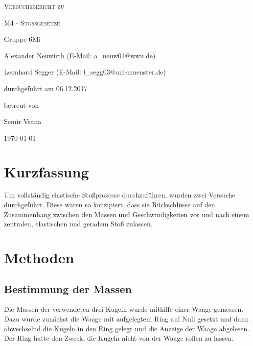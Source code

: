 \documentclass[
	a4paper,
	12pt,
	pagesize,
	ngerman
]{scrartcl}
\begin{document}
	
	\begin{titlepage}
		\centering
		{\scshape\LARGE Versuchsbericht zu \par}
		\vspace{1cm}
		{\scshape\huge M4 - Stoßgesetze\par}
		\vspace{2.5cm}
		{\LARGE Gruppe 6Mi \par}
		\vspace{0.5cm}
		
		{\large Alexander Neuwirth (E-Mail: a\_neuw01@wwu.de) \par}
		{\large Leonhard Segger (E-Mail: l\_segg03@uni-muenster.de) \par}
		\vfill
		
		durchgeführt am 06.12.2017\par
		betreut von\par
		{\large Semir Vrana}
		
		\vfill
		
		{\large \today\par}
	\end{titlepage}
	\tableofcontents
	\newpage
	
	\section{Kurzfassung}
	Um vollständig elastische Stoßprozesse durchzuführen, wurden zwei Versuche durchgeführt.
	Diese waren so konzipiert, dass sie Rückschlüsse auf den Zusammenhang zwischen den Massen und Geschwindigkeiten vor und nach einem zentralen, elastischen und geradem Stoß zulassen.
	
	\section{Methoden}
	\subsection{Bestimmung der Massen}
	Die Massen der verwendeten drei Kugeln wurde mithilfe einer Waage gemessen.
	Dazu wurde zunächst die Waage mit aufgelegtem Ring auf Null gesetzt und dann abwechselnd die Kugeln in den Ring gelegt und die Anzeige der Waage abgelesen.
	Der Ring hatte den Zweck, die Kugeln nicht von der Waage rollen zu lassen. %
	
\end{document}

